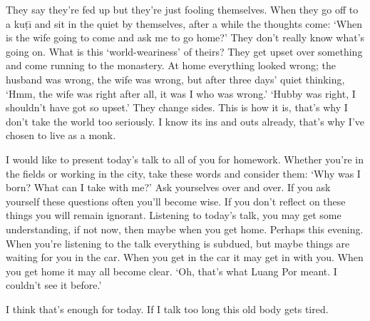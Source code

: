 They say they're fed up but they're just fooling themselves. When they go off to a ku\d{t}\={\i} and sit in the quiet by themselves, after a while the thoughts come: `When is the wife going to come and ask me to go home?' They don't really know what's going on. What is this `world-weariness' of theirs? They get upset over something and come running to the monastery. At home everything looked wrong; the husband was wrong, the wife was wrong, but after three days' quiet thinking, `Hmm, the wife was right after all, it was I who was wrong.' `Hubby was right, I shouldn't have got so upset.' They change sides. This is how it is, that's why I don't take the world too seriously. I know its ins and outs already, that's why I've chosen to live as a monk.

I would like to present today's talk to all of you for homework. Whether you're in the fields or working in the city, take these words and consider them: `Why was I born? What can I take with me?' Ask yourselves over and over. If you ask yourself these questions often you'll become wise. If you don't reflect on these things you will remain ignorant. Listening to today's talk, you may get some understanding, if not now, then maybe when you get home. Perhaps this evening. When you're listening to the talk everything is subdued, but maybe things are waiting for you in the car. When you get in the car it may get in with you. When you get home it may all become clear. `Oh, that's what Luang Por meant. I couldn't see it before.'

I think that's enough for today. If I talk too long this old body gets tired.

